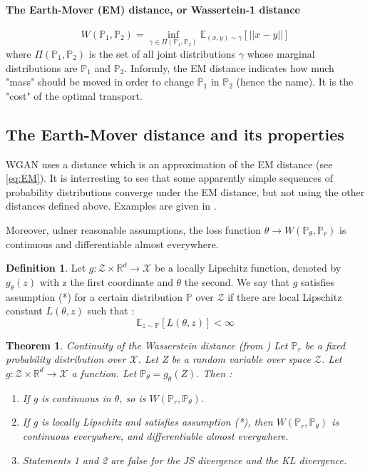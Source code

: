 \documentclass[a4paper]{article}
\newcommand{\X}{\mathcal{X}}
\newcommand{\Expec}{\mathbb{E}}
\newcommand{\Prob}{\mathbb{P}}
\newcommand{\real}{\mathbb{R}}
\theoremstyle{plain}
\newtheorem{thm}{Theorem}
\theoremstyle{remark}
\theoremstyle{definition}
\newtheorem{defi}{Definition}
\begin{document}
\paragraph{The Earth-Mover (EM) distance, or Wassertein-1 distance}
\begin{equation}
\label{eq:EM}
W(\Prob_1, \Prob_2) = \inf_{\gamma \in \Pi(\Prob_1,\Prob_2)} \Expec_{(x,y) \sim \gamma}[ ||x-y||]
\end{equation}
where $\Pi(\Prob_1,\Prob_2)$ is the set of all joint distributions $\gamma$ whose marginal distributions are $\Prob_1$ and $\Prob_2$. Informly, the EM distance indicates how much "mass" should be moved in order to change $\Prob_1$ in $\Prob_2$ (hence the name). It is the "cost" of the optimal transport.

\subsection{The Earth-Mover distance and its properties}

WGAN uses a distance which is an approximation of the EM distance (see \ref{eq:EM}).
It is interresting to see that some apparently simple sequences of probability distributions converge under the EM distance, but not using the other distances defined above. Examples are given in \cite{arjovsky2017wasserstein}.

Moreover, udner reasonable assumptions, the loss function $\theta \rightarrow W(\Prob_\theta , \Prob_r)$ is continuous and differentiable almost everywhere.

\begin{defi}
Let $g : \mathcal{Z}\times\real^d \rightarrow \X$ be a locally Lipschitz function, denoted by $g_\theta(z)$ with z the first coordinate and $\theta$ the second. We say that $g$ satisfies assumption (*) for a certain distribution $\Prob$ over $\mathcal{Z}$ if there are local Lipschitz constant $L(\theta,z)$ such that :
$$\Expec_{z \sim \Prob}[L(\theta,z)] < \infty$$ 
\end{defi}

\begin{thm}{Continuity of the Wasserstein distance (from \cite{arjovsky2017wasserstein})}
Let $\Prob_r$ be a fixed probability distribution over $\X$. Let Z be a random variable over space $\mathcal{Z}$. Let $g : \mathcal{Z}\times\real^d \rightarrow \X$ a function. Let $\Prob_\theta = g_\theta(Z)$. Then :

\begin{enumerate}
\item If g is continuous in $\theta$, so is $W(\Prob_r, \Prob_\theta)$.
\item If g is locally Lipschitz and satisfies assumption (*), then $W(\Prob_r , \Prob_\theta)$
is continuous everywhere, and differentiable almost everywhere.
\item Statements 1 and 2 are false for the JS divergence and the KL divergence.
\end{enumerate}
\end{thm}
\end{document}
